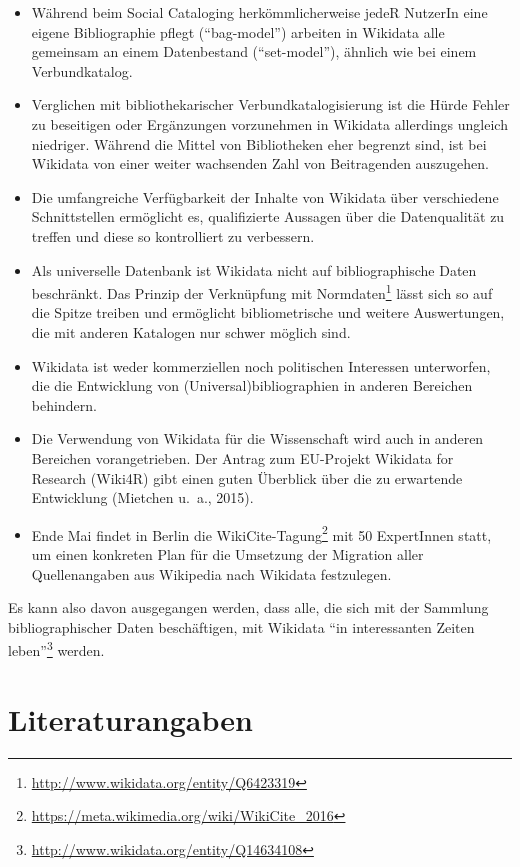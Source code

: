 \documentclass[a4paper,
fontsize=11pt,
oneside,
numbers=noperiodatend,
parskip=half-,
bibliography=totoc,
final
]{scrartcl}
\begin{document}
\begin{itemize}
\item
  Während beim Social Cataloging herkömmlicherweise jedeR NutzerIn eine
  eigene Bibliographie pflegt (\enquote{bag-model}) arbeiten in Wikidata
  alle gemeinsam an einem Datenbestand (\enquote{set-model}), ähnlich
  wie bei einem Verbundkatalog.
\item
  Verglichen mit bibliothekarischer Verbundkatalogisierung ist die Hürde
  Fehler zu beseitigen oder Ergänzungen vorzunehmen in Wikidata
  allerdings ungleich niedriger. Während die Mittel von Bibliotheken
  eher begrenzt sind, ist bei Wikidata von einer weiter wachsenden Zahl
  von Beitragenden auszugehen.
\item
  Die umfangreiche Verfügbarkeit der Inhalte von Wikidata über
  verschiedene Schnittstellen ermöglicht es, qualifizierte Aussagen über
  die Datenqualität zu treffen und diese so kontrolliert zu verbessern.
\item
  Als universelle Datenbank ist Wikidata nicht auf bibliographische
  Daten beschränkt. Das Prinzip der Verknüpfung mit Normdaten\footnote{\url{http://www.wikidata.org/entity/Q6423319}}
  lässt sich so auf die Spitze treiben und ermöglicht bibliometrische
  und weitere Auswertungen, die mit anderen Katalogen nur schwer möglich
  sind.
\item
  Wikidata ist weder kommerziellen noch politischen Interessen
  unterworfen, die die Entwicklung von (Universal)bibliographien in
  anderen Bereichen behindern.
\item
  Die Verwendung von Wikidata für die Wissenschaft wird auch in anderen
  Bereichen vorangetrieben. Der Antrag zum EU-Projekt Wikidata for
  Research (Wiki4R) gibt einen guten Überblick über die zu erwartende
  Entwicklung (Mietchen u.~a., 2015).
\item
  Ende Mai findet in Berlin die WikiCite-Tagung\footnote{\url{https://meta.wikimedia.org/wiki/WikiCite_2016}}
  mit 50 ExpertInnen statt, um einen konkreten Plan für die Umsetzung
  der Migration aller Quellenangaben aus Wikipedia nach Wikidata
  festzulegen.
\end{itemize}

Es kann also davon ausgegangen werden, dass alle, die sich mit der
Sammlung bibliographischer Daten beschäftigen, mit Wikidata \enquote{in
interessanten Zeiten leben}\footnote{\url{http://www.wikidata.org/entity/Q14634108}}
werden.

\section*{Literaturangaben}\label{literaturangaben}
\end{document}
